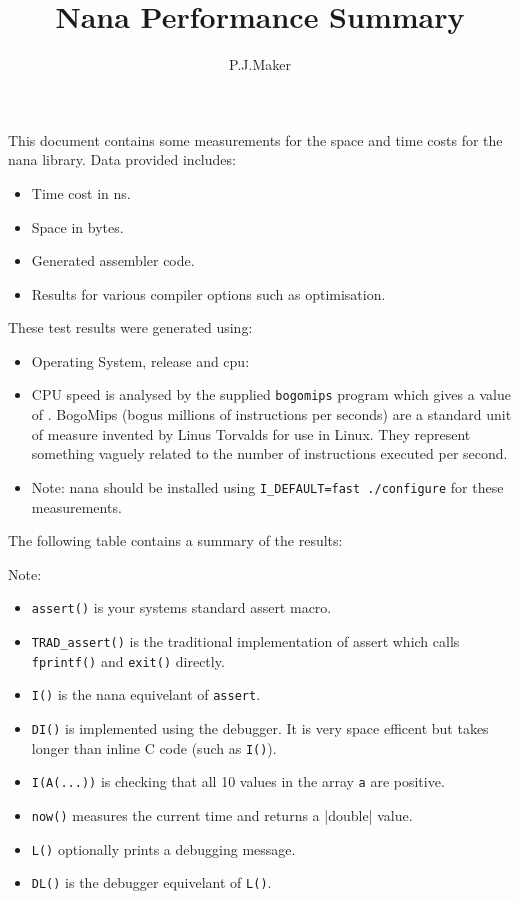 \documentclass[a4paper]{article}
\begin{document}
\title{Nana Performance Summary}
\author{P.J.Maker}
\maketitle

This document contains some measurements for the space and time costs
for the nana library. Data provided includes:

\begin{itemize}
\item Time cost in ns. 
\item Space in bytes.
\item Generated assembler code.
\item Results for various compiler options such as optimisation. 
\end{itemize}

These test results were generated using:

\begin{itemize}
\item Operating System, release and cpu: 
\item CPU speed is analysed by the supplied \verb+bogomips+ program
  which gives a value of . BogoMips (bogus
  millions of instructions per seconds) are a standard unit of measure
  invented by Linus Torvalds for use in Linux. They represent something
  vaguely related to the number of instructions executed per second.
\item Note: nana should be installed using \verb|I_DEFAULT=fast ./configure|
for these measurements.
\end{itemize}

The following table contains a summary of the results:

        

Note:

\begin{itemize}
\item \verb|assert()| is your systems standard assert macro.
\item \verb|TRAD_assert()| is the traditional implementation of assert
  which calls \verb|fprintf()| and \verb|exit()| directly.
\item \verb|I()| is the nana equivelant of \verb|assert|.
\item \verb|DI()| is implemented using the debugger. It is very space efficent
  but takes longer than inline C code (such as \verb|I()|).
\item \verb|I(A(...))| is checking that all 10 values in the array
  \verb|a| are positive. 
\item \verb|now()| measures the current time and returns a |double|
  value.
\item \verb|L()| optionally prints a debugging message.
\item \verb|DL()| is the debugger equivelant of \verb|L()|. 
\end{itemize}
\end{document}
